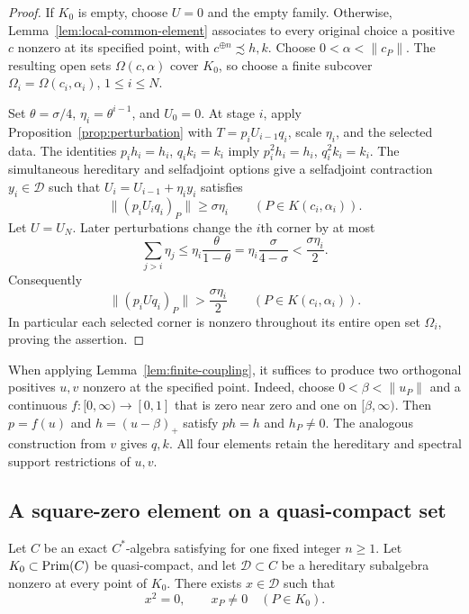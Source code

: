 \begin{proof}
If $K_0$ is empty, choose $U=0$ and the empty family.  Otherwise,
Lemma~\ref{lem:local-common-element} associates to every original
choice a positive $c$ nonzero at its specified point, with
$c^{\oplus n}\precsim h,k$.  Choose
$0<\alpha<\|c_P\|$.  The resulting open sets
$\Omega(c,\alpha)$ cover $K_0$, so choose a finite subcover
$\Omega_i=\Omega(c_i,\alpha_i)$, $1\le i\le N$.

Set $\theta=\sigma/4$, $\eta_i=\theta^{i-1}$, and $U_0=0$.
At stage $i$, apply Proposition~\ref{prop:perturbation} with
$T=p_iU_{i-1}q_i$, scale $\eta_i$, and the selected data.
The identities $p_ih_i=h_i$, $q_ik_i=k_i$ imply
$p_i^2h_i=h_i$, $q_i^2k_i=k_i$.  The simultaneous hereditary and
selfadjoint options give a selfadjoint contraction
$y_i\in\mathcal D$ such that $U_i=U_{i-1}+\eta_i y_i$ satisfies
\[
 \|(p_iU_iq_i)_P\|\ge\sigma\eta_i
 \qquad(P\in K(c_i,\alpha_i)).
\]
Let $U=U_N$.  Later perturbations change the $i$th corner by at
most
\[
 \sum_{j>i}\eta_j
 \le\eta_i\frac{\theta}{1-\theta}
 =\eta_i\frac{\sigma}{4-\sigma}
 <\frac{\sigma\eta_i}{2}.
\]
Consequently
\begin{equation}\label{eq:finite-coupling-bound}
 \|(p_iUq_i)_P\|>\frac{\sigma\eta_i}{2}
 \qquad(P\in K(c_i,\alpha_i)).
\end{equation}
In particular each selected corner is nonzero throughout its
entire open set $\Omega_i$, proving the assertion.
\end{proof}

When applying Lemma~\ref{lem:finite-coupling}, it suffices to
produce two orthogonal positives $u,v$ nonzero at the specified
point.  Indeed, choose $0<\beta<\|u_P\|$ and a continuous
$f:[0,\infty)\to[0,1]$ that is zero near zero and one on
$[\beta,\infty)$.  Then $p=f(u)$ and $h=(u-\beta)_+$ satisfy
$ph=h$ and $h_P\ne0$.  The analogous construction from $v$ gives
$q,k$.  All four elements retain the hereditary and spectral
support restrictions of $u,v$.

\subsection{A square-zero element on a quasi-compact set}

\begin{proposition}\label{prop:square-zero}
Let $C$ be an exact $C^*$-algebra satisfying \propF{} for one fixed
integer $n\geq1$.  Let $K_0\subset\operatorname{Prim}(C)$ be quasi-compact, and let
$\mathcal D\subset C$ be a hereditary subalgebra nonzero at every
point of $K_0$.  There exists $x\in\mathcal D$ such that
\[
 x^2=0,\qquad x_P\ne0\quad(P\in K_0).
\]
\end{proposition}

